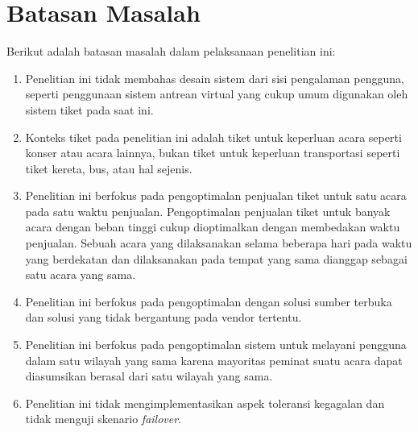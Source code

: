 \section{Batasan Masalah}
\label{sec:batasan-masalah}

Berikut adalah batasan masalah dalam pelaksanaan penelitian ini:

\begin{enumerate}
  \item Penelitian ini tidak membahas desain sistem dari sisi pengalaman pengguna, seperti penggunaan sistem antrean virtual yang cukup umum digunakan oleh sistem tiket pada saat ini.
  \item Konteks tiket pada penelitian ini adalah tiket untuk keperluan acara seperti konser atau acara lainnya, bukan tiket untuk keperluan transportasi seperti tiket kereta, bus, atau hal sejenis.
  \item Penelitian ini berfokus pada pengoptimalan penjualan tiket untuk satu acara pada satu waktu penjualan. Pengoptimalan penjualan tiket untuk banyak acara dengan beban tinggi cukup dioptimalkan dengan membedakan waktu penjualan. Sebuah acara yang dilaksanakan selama beberapa hari pada waktu yang berdekatan dan dilaksanakan pada tempat yang sama dianggap sebagai satu acara yang sama.
  \item Penelitian ini berfokus pada pengoptimalan dengan solusi sumber terbuka dan solusi yang tidak bergantung pada vendor tertentu.
  \item Penelitian ini berfokus pada pengoptimalan sistem untuk melayani pengguna dalam satu wilayah yang sama karena mayoritas peminat suatu acara dapat diasumsikan berasal dari satu wilayah yang sama.
  \item Penelitian ini tidak mengimplementasikan aspek toleransi kegagalan dan tidak menguji skenario \textit{failover}.
\end{enumerate}
